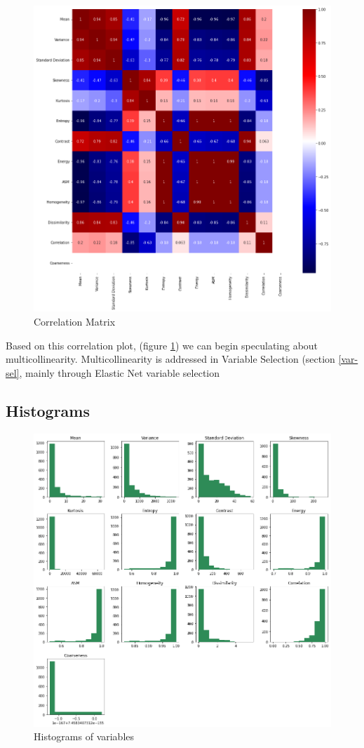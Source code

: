\documentclass{article}
\begin{document}
\begin{figure}[H]
    \centering
    \includegraphics[width = .9\textwidth]{images/corr-matrix.png}
    \caption{Correlation Matrix}
    \label{corr-matrix}
\end{figure}

Based on this correlation plot, (figure \ref{corr-matrix})  we can begin speculating about multicollinearity. Multicollinearity is addressed in Variable Selection (section \ref{var-sel}, mainly through Elastic Net variable selection

\subsection{Histograms}
\begin{figure}[H]
    \centering
    \includegraphics[width = .9\textwidth]{images/histograms.png}
    \caption{Histograms of variables}
    \label{histograms}
\end{figure}
\end{document}
